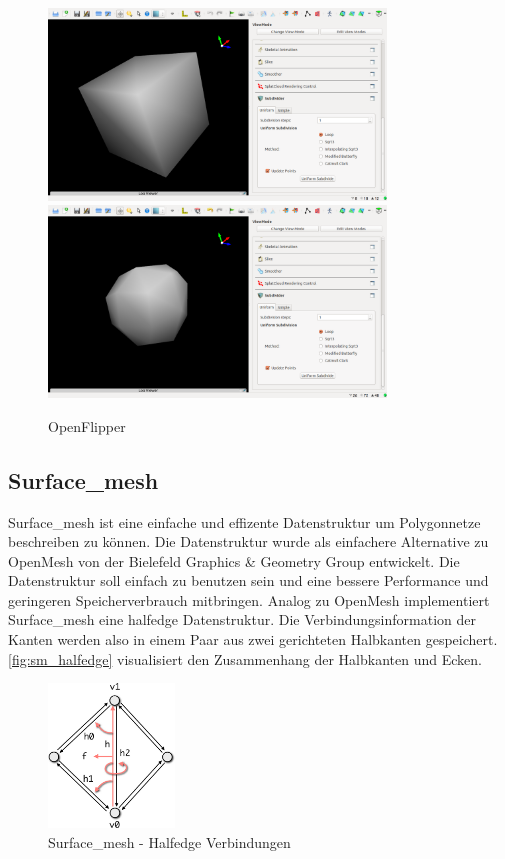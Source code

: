 \begin{figure}
  \centering
  \includegraphics[width=0.8\textwidth]{content/media/openflipper_cube}
  \includegraphics[width=0.8\textwidth]{content/media/openflipper_loop}
  \caption{OpenFlipper}
  \label{fig:openflipper}
\end{figure}


\subsection{Surface\_mesh}

Surface\_mesh \cite{Sieger.} ist eine einfache und effizente Datenstruktur um Polygonnetze beschreiben zu können.
Die Datenstruktur wurde als einfachere Alternative zu OpenMesh von der Bielefeld Graphics \& Geometry Group entwickelt.
Die Datenstruktur soll einfach zu benutzen sein und eine bessere Performance und geringeren Speicherverbrauch mitbringen.
Analog zu OpenMesh implementiert Surface\_mesh eine halfedge Datenstruktur.
Die Verbindungsinformation der Kanten werden also in einem Paar aus zwei gerichteten Halbkanten gespeichert.
\autoref{fig:sm_halfedge} visualisiert den Zusammenhang der Halbkanten und Ecken.

\begin{figure}
  \centering
  \includegraphics[width=0.3\textwidth]{content/media/sm_connectivity-queries}
  \caption{Surface\_mesh - Halfedge Verbindungen \cite{OpenGP.24.07.2015}}
  \label{fig:sm_halfedge}
\end{figure}

